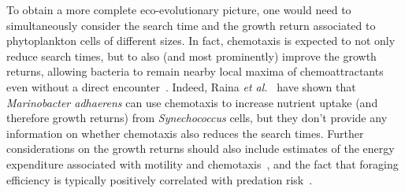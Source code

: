\documentclass[9pt,twocolumn,twoside]{pnas-new}
\begin{document}
To obtain a more complete eco-evolutionary picture, one would need to simultaneously consider the search time and the growth return associated to phytoplankton cells of different sizes. %
In fact, chemotaxis is expected to not only reduce search times, but to also (and most prominently) improve the growth returns, allowing bacteria to remain nearby local maxima of chemoattractants even without a direct encounter~\cite{fernandez2019foraging}.
Indeed, Raina \textit{et al.}~\cite{raina2023chemotaxis} have shown that \textit{Marinobacter adhaerens} can use chemotaxis to increase nutrient uptake (and therefore growth returns) from \textit{Synechococcus} cells, but they don't provide any information on whether chemotaxis also reduces the search times.
%
Further considerations on the growth returns should also include estimates of the energy expenditure associated with motility and chemotaxis~\cite{malaguti2021theory,keegstra2022ecological}, and the fact that foraging efficiency is typically positively correlated with predation risk~\cite{nielsen2021foraging}.
\end{document}

